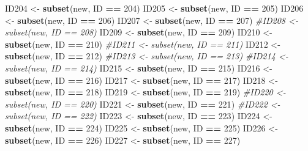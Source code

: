 \documentclass[
]{book}
\newenvironment{Shaded}{\begin{snugshade}}{\end{snugshade}}
\newcommand{\CommentTok}[1]{\textcolor[rgb]{0.56,0.35,0.01}{\textit{#1}}}
\newcommand{\DecValTok}[1]{\textcolor[rgb]{0.00,0.00,0.81}{#1}}
\newcommand{\KeywordTok}[1]{\textcolor[rgb]{0.13,0.29,0.53}{\textbf{#1}}}
\newcommand{\NormalTok}[1]{#1}
\newcommand{\OperatorTok}[1]{\textcolor[rgb]{0.81,0.36,0.00}{\textbf{#1}}}
\newcommand{\StringTok}[1]{\textcolor[rgb]{0.31,0.60,0.02}{#1}}
\begin{document}
\begin{Shaded}
\begin{Highlighting}[]
{{{{{{\NormalTok{ID204 <-}\StringTok{ }\KeywordTok{subset}\NormalTok{(new, ID }\OperatorTok{==}\StringTok{ }\DecValTok{204}\NormalTok{)}
\NormalTok{ID205 <-}\StringTok{ }\KeywordTok{subset}\NormalTok{(new, ID }\OperatorTok{==}\StringTok{ }\DecValTok{205}\NormalTok{)}
\NormalTok{ID206 <-}\StringTok{ }\KeywordTok{subset}\NormalTok{(new, ID }\OperatorTok{==}\StringTok{ }\DecValTok{206}\NormalTok{)}
\NormalTok{ID207 <-}\StringTok{ }\KeywordTok{subset}\NormalTok{(new, ID }\OperatorTok{==}\StringTok{ }\DecValTok{207}\NormalTok{)}
\CommentTok{#ID208 <- subset(new, ID == 208)}
\NormalTok{ID209 <-}\StringTok{ }\KeywordTok{subset}\NormalTok{(new, ID }\OperatorTok{==}\StringTok{ }\DecValTok{209}\NormalTok{)}
\NormalTok{ID210 <-}\StringTok{ }\KeywordTok{subset}\NormalTok{(new, ID }\OperatorTok{==}\StringTok{ }\DecValTok{210}\NormalTok{)}
\CommentTok{#ID211 <- subset(new, ID == 211)}
\NormalTok{ID212 <-}\StringTok{ }\KeywordTok{subset}\NormalTok{(new, ID }\OperatorTok{==}\StringTok{ }\DecValTok{212}\NormalTok{)}
\CommentTok{#ID213 <- subset(new, ID == 213)}
\CommentTok{#ID214 <- subset(new, ID == 214)}
\NormalTok{ID215 <-}\StringTok{ }\KeywordTok{subset}\NormalTok{(new, ID }\OperatorTok{==}\StringTok{ }\DecValTok{215}\NormalTok{)}
\NormalTok{ID216 <-}\StringTok{ }\KeywordTok{subset}\NormalTok{(new, ID }\OperatorTok{==}\StringTok{ }\DecValTok{216}\NormalTok{)}
\NormalTok{ID217 <-}\StringTok{ }\KeywordTok{subset}\NormalTok{(new, ID }\OperatorTok{==}\StringTok{ }\DecValTok{217}\NormalTok{)}
\NormalTok{ID218 <-}\StringTok{ }\KeywordTok{subset}\NormalTok{(new, ID }\OperatorTok{==}\StringTok{ }\DecValTok{218}\NormalTok{)}
\NormalTok{ID219 <-}\StringTok{ }\KeywordTok{subset}\NormalTok{(new, ID }\OperatorTok{==}\StringTok{ }\DecValTok{219}\NormalTok{)}
\CommentTok{#ID220 <- subset(new, ID == 220)}
\NormalTok{ID221 <-}\StringTok{ }\KeywordTok{subset}\NormalTok{(new, ID }\OperatorTok{==}\StringTok{ }\DecValTok{221}\NormalTok{)}
\CommentTok{#ID222 <- subset(new, ID == 222)}
\NormalTok{ID223 <-}\StringTok{ }\KeywordTok{subset}\NormalTok{(new, ID }\OperatorTok{==}\StringTok{ }\DecValTok{223}\NormalTok{)}
\NormalTok{ID224 <-}\StringTok{ }\KeywordTok{subset}\NormalTok{(new, ID }\OperatorTok{==}\StringTok{ }\DecValTok{224}\NormalTok{)}
\NormalTok{ID225 <-}\StringTok{ }\KeywordTok{subset}\NormalTok{(new, ID }\OperatorTok{==}\StringTok{ }\DecValTok{225}\NormalTok{)}
\NormalTok{ID226 <-}\StringTok{ }\KeywordTok{subset}\NormalTok{(new, ID }\OperatorTok{==}\StringTok{ }\DecValTok{226}\NormalTok{)}
\NormalTok{ID227 <-}\StringTok{ }\KeywordTok{subset}\NormalTok{(new, ID }\OperatorTok{==}\StringTok{ }\DecValTok{227}\NormalTok{)}

}}}}}}
\end{Highlighting}
\end{Shaded}
\end{document}
